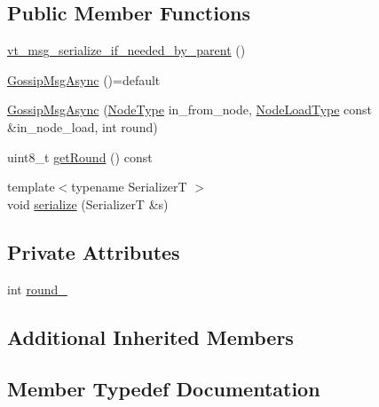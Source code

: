 \subsection*{Public Member Functions}
\begin{DoxyCompactItemize}
\item 
\hyperlink{structvt_1_1vrt_1_1collection_1_1balance_1_1_gossip_msg_async_a24fb1f6c4e345abf7ae0918fc3b6c7e7}{vt\+\_\+msg\+\_\+serialize\+\_\+if\+\_\+needed\+\_\+by\+\_\+parent} ()
\item 
\hyperlink{structvt_1_1vrt_1_1collection_1_1balance_1_1_gossip_msg_async_a553489ced5a288ba9d8c26c7a64f9735}{Gossip\+Msg\+Async} ()=default
\item 
\hyperlink{structvt_1_1vrt_1_1collection_1_1balance_1_1_gossip_msg_async_a9b9143f646c45b29056ff8d3e493e645}{Gossip\+Msg\+Async} (\hyperlink{namespacevt_a866da9d0efc19c0a1ce79e9e492f47e2}{Node\+Type} in\+\_\+from\+\_\+node, \hyperlink{structvt_1_1vrt_1_1collection_1_1balance_1_1_gossip_msg_a8deef056cb137cfd67540a31be189122}{Node\+Load\+Type} const \&in\+\_\+node\+\_\+load, int round)
\item 
uint8\+\_\+t \hyperlink{structvt_1_1vrt_1_1collection_1_1balance_1_1_gossip_msg_async_ae2566fc6ba7ee884f37c3e5892e8b7f8}{get\+Round} () const
\item 
{\footnotesize template$<$typename SerializerT $>$ }\\void \hyperlink{structvt_1_1vrt_1_1collection_1_1balance_1_1_gossip_msg_async_a38fc9b36befaaff0c4e9022cfd1dbfa6}{serialize} (SerializerT \&s)
\end{DoxyCompactItemize}
\subsection*{Private Attributes}
\begin{DoxyCompactItemize}
\item 
int \hyperlink{structvt_1_1vrt_1_1collection_1_1balance_1_1_gossip_msg_async_a4cb61d70b5c1aed961b80b1d1c7493e4}{round\+\_\+}
\end{DoxyCompactItemize}
\subsection*{Additional Inherited Members}


\subsection{Member Typedef Documentation}
\mbox{\label{structvt_1_1vrt_1_1collection_1_1balance_1_1_gossip_msg_async_a5693222c4f2f5cf7641120d9e815bde7}} 

